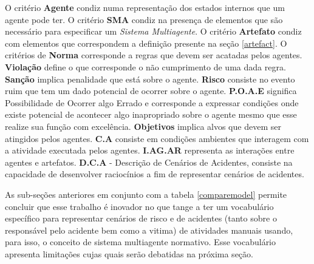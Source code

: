 O critério \textbf{Agente} condiz numa representação dos estados internos que um agente pode ter. O critério \textbf{SMA} condiz na presença de elementos que são necessário para especificar um \textit{Sistema Multiagente}. O critério \textbf{Artefato} condiz com elementos que correspondem a definição presente na seção \ref{artefact}. O critérios de \textbf{Norma} corresponde a regras que devem ser acatadas pelos agentes. \textbf{Violação} define o que corresponde o não cumprimento de uma dada regra. \textbf{Sanção} implica penalidade que está sobre o agente. \textbf{Risco} consiste no evento ruim que tem um dado potencial de ocorrer sobre o agente. \textbf{P.O.A.E} significa Possibilidade de Ocorrer algo Errado e corresponde a expressar condições onde existe potencial de acontecer algo inapropriado sobre o agente mesmo que esse realize sua função com excelência.  \textbf{Objetivos} implica alvos que devem ser atingidos pelos agentes. \textbf{C.A} consiste em condições ambientes que interagem com a atividade executada pelos agentes. \textbf{I.AG.AR} representa as interações entre agentes e artefatos. \textbf{D.C.A} - Descrição de Cenários de Acidentes, consiste na capacidade de desenvolver raciocínios a fim de representar cenários de acidentes.

As sub-seções anteriores em conjunto com a tabela \ref{comparemodel} permite concluir que esse trabalho é inovador no que tange a ter um vocabulário específico para representar cenários de risco e de acidentes (tanto sobre o responsável pelo acidente bem como a vitima) de atividades manuais usando, para isso, o conceito de sistema multiagente normativo. Esse vocabulário apresenta limitações cujas quais serão debatidas na próxima seção. 